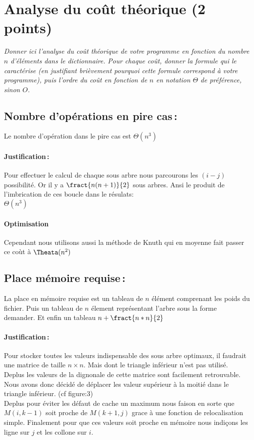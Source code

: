 \documentclass[a4paper, 10pt, french]{article}
\begin{document}
\section{Analyse du coût théorique (2 points)}
{\em Donner ici l'analyse du coût théorique de votre programme en fonction du nombre $n$ d'éléments dans le dictionnaire.
 Pour chaque coût, donner la formule qui le caractérise (en justifiant brièvement pourquoi cette formule correspond à votre programme), 
 puis l'ordre du coût en fonction de $n$ en notation $\Theta$ de préférence, sinon $O$.}

  \subsection{Nombre  d'opérations en pire cas\,: }
    Le nombre d'opération dans le pire cas est $\Theta(n^3)$
    \paragraph{Justification\,: }
	Pour effectuer le calcul de chaque sous arbre nous parcourons les $(i-j)$ possibilité. Or il y a $\fract{n(n+1)}{2}$ sous arbres. Ansi le produit de l'imbrication de ces boucle dans le résulats: \\
	$\Theta(n^3)$
    \paragraph{Optimisation}
    Cependant nous utilisons aussi la méthode de Knuth qui en moyenne fait passer ce coùt à $\Theata(n^2)$
      \subsection{Place mémoire requise\,: }
      La place en mémoire requise est un tableau de $n$ élément comprenant les poids du fichier. Puis un tableau de $n$ élement représentant l'arbre sous la forme demander. Et enfin un tableau $n+\fract{n*n}{2}$
    \paragraph{Justification\,: }
    Pour stocker toutes les valeurs indispensable des sous arbre optimaux, il faudrait une matrice de taille $n\times n$. Mais dont le triangle inférieur n'est pas utilisé. Deplus les valeurs de la dignonale de cette matrice sont facilement retrouvable. Nous avons donc décidé de déplacer les valeur supérieur à la moitié dans le triangle inférieur. (cf figure:3) \\
    Deplus pour éviter les défaut de cache un maximum nous faison en sorte que $M(i,k-1)$ soit proche de $M(k+1,j)$ grace à une fonction de relocalisation simple. 
    Finalement pour que ces valeurs soit proche en mémoire nous indiçons les ligne sur $j$ et les collone sur $i$.
\end{document}
